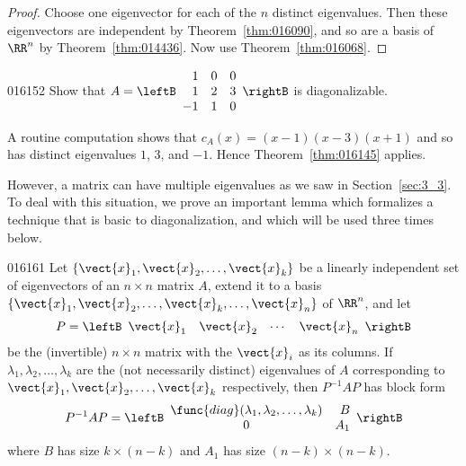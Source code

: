 \begin{proof}
Choose one eigenvector for each of the $n$ distinct eigenvalues. Then these eigenvectors are independent by Theorem~\ref{thm:016090}, and so are a basis of $\RR^n$ by Theorem~\ref{thm:014436}. Now use Theorem~\ref{thm:016068}.
\end{proof}

\begin{example}{}{016152}
Show that $A = 
\leftB \begin{array}{rrr}
1 & 0 & 0 \\
1 & 2 & 3 \\
-1 & 1 & 0 \\
\end{array} \rightB$ is diagonalizable.

\begin{solution}
A routine computation shows that $c_{A}(x) = (x - 1)(x - 3)(x + 1)$ and so has distinct eigenvalues $1$, $3$, and $-1$. Hence Theorem~\ref{thm:016145} applies.
\end{solution}
\end{example}

However, a matrix can have multiple eigenvalues as we saw in Section~\ref{sec:3_3}. To deal with this situation, we prove an important lemma which formalizes a technique that is basic to diagonalization, and which will be used three times below.


\begin{lemma}{}{016161}
Let $\{\vect{x}_{1}, \vect{x}_{2}, \dots, \vect{x}_{k}\}$ be a linearly independent set of eigenvectors of an $n \times n$ matrix $A$, extend it to a basis $\{\vect{x}_{1}, \vect{x}_{2}, \dots, \vect{x}_{k}, \dots, \vect{x}_{n}\}$ of $\RR^n$, and let
\begin{equation*}
P = 
\leftB \begin{array}{cccc}
\vect{x}_1 & \vect{x}_2 & \cdots  & \vect{x}_n
\end{array} \rightB
\end{equation*}
be the (invertible) $n \times n$ matrix with the $\vect{x}_{i}$ as its columns. If $\lambda_{1}, \lambda_{2}, \dots, \lambda_{k}$ are the (not necessarily distinct) eigenvalues of $A$ corresponding to $\vect{x}_{1}, \vect{x}_{2}, \dots, \vect{x}_{k}$ respectively, then $P^{-1}AP$ has block form
\begin{equation*}
P^{-1}AP = 
\leftB \begin{array}{cr}
\func{diag}(\lambda_1, \lambda_2, \dots, \lambda_k) & B \\
0 & A_1
\end{array} \rightB
\end{equation*}
where $B$ has size $k \times (n - k)$ and $A_1$ has size $(n - k) \times (n - k)$.
\end{lemma}

